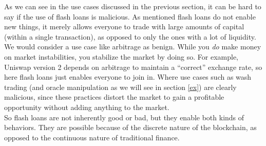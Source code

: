 As we can see in the use cases discussed in the previous section, it can be hard
to say if the use of flash loans is malicious. As mentioned flash loans do not
enable new things, it merely allows everyone to trade with large amounts of
capital (within a single transaction), as opposed to only the ones with a lot of
liquidity. We would consider a use case like arbitrage as benign. While you
\textit{do} make money on market instabilities, you stabilize the market by
doing so. For example, Uniswap version 2 depends on arbitrage to maintain a
``correct'' exchange rate, so here flash loans just enables everyone to join in.
Where use cases such as wash trading (and oracle manipulation as we will see in
section \ref{ex}) are clearly malicious, since these practices distort the
market to gain a profitable opportunity without adding anything to the market.\\

So flash loans are not inherently good or bad, but they enable both kinds of
behaviors. They are possible because of the discrete nature of the blockchain,
as opposed to the continuous nature of traditional finance.
